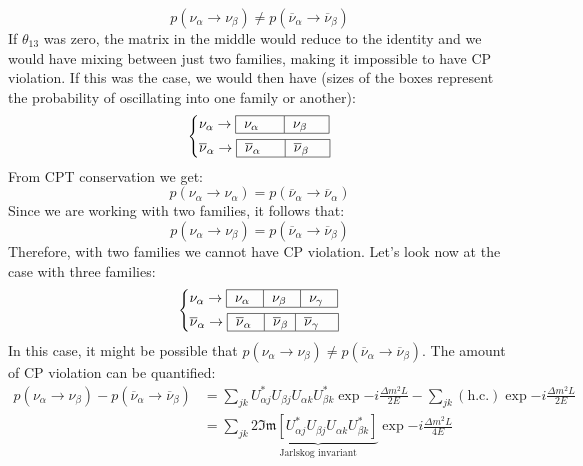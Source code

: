 \documentclass[10.75pt,a4paper,openright,bottom=2cm]{article}
\begin{document}
\[
p(\nu_\alpha\to\nu_\beta)\neq p(\overline{\nu}_\alpha\to\overline{\nu}_\beta)
\]
If $\theta_{13}$ was zero, the matrix in the middle would reduce to the identity and we would have mixing between just two families, making it impossible to have CP violation. If this was the case, we would then have (sizes of the boxes represent the probability of oscillating into one family or another):
\[
\left\{
\begin{aligned}
&\nu_\alpha\to\begin{tabular}{|p{0.8cm}|p{0.7cm}|}
\hline
    $\nu_\alpha$ & $\nu_\beta$ \\
    \hline
\end{tabular}\\
&\overline{\nu}_\alpha\to\begin{tabular}{|p{0.8cm}|p{0.7cm}|}
\hline
    $\overline{\nu}_\alpha$ & $\overline{\nu}_\beta$ \\
    \hline
\end{tabular}
\end{aligned}
\right.
\]
From CPT conservation we get:
\[
p(\nu_\alpha\to\nu_\alpha)=p(\overline{\nu}_\alpha\to\overline{\nu}_\alpha)
\]
Since we are working with two families, it follows that:
\[
p(\nu_\alpha\to\nu_\beta)=p(\overline{\nu}_\alpha\to\overline{\nu}_\beta)
\]
Therefore, with two families we cannot have CP violation. Let's look now at the case with three families:
\[
\left\{
\begin{aligned}
&\nu_\alpha\to\begin{tabular}{|p{0.5cm}|p{0.5cm}|p{0.5cm}|}
\hline
    $\nu_\alpha$ & $\nu_\beta$ & $\nu_\gamma$\\
    \hline
\end{tabular}\\
&\overline{\nu}_\alpha\to\begin{tabular}{|p{0.5cm}|p{0.35cm}|p{0.65cm}|}
\hline
    $\overline{\nu}_\alpha$ & $\overline{\nu}_\beta$ & $\overline{\nu}_\gamma$ \\
    \hline
\end{tabular}
\end{aligned}
\right.
\]
In this case, it might be possible that $p(\nu_\alpha\to\nu_\beta)\neq p(\overline{\nu}_\alpha\to\overline{\nu}_\beta)$. The amount of CP violation can be quantified:
\begin{align*}
p(\nu_\alpha\to\nu_\beta)-p(\overline{\nu}_\alpha\to\overline{\nu}_\beta)&=\sum_{jk}U_{\alpha j}^*U_{\beta j}U_{\alpha k}U_{\beta k}^*\exp{-i\frac{\Delta m^2L}{2E}}-\sum_{jk}(\text{h.c.})\exp{-i\frac{\Delta m^2L}{2E}}\\
&=\sum_{jk}2\underbrace{\mathfrak{Im}[U_{\alpha j}^*U_{\beta j}U_{\alpha k}U_{\beta k}^*]}_{\text{Jarlskog invariant}}\exp{-i\frac{\Delta m^2L}{4E}}
\end{align*}
\end{document}
